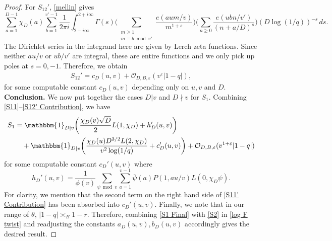 \documentclass[10pt,a4paper]{amsart}
\newcommand{\m}{\mathrm{m}}
\newcommand{\ol}{\overline}
\begin{document}
\begin{proof}
For $S_{12}'$, \eqref{mellin} gives 
\[
\sum_{a=1}^{D-1}\chi_D(a)\sum_{b=1}^{v'-1}
\frac{1}{2\pi i }\int_{2-i\infty}^{2+i\infty}
\Gamma(s)\bigg(\sum_{\substack{m\geq 1\\m\equiv b \bmod v'}}\frac{e(aum/v)}{m^{1+s}}\bigg)\bigg(\sum_{n\geq 0}\frac{e(ubn/v')}{(n+a/D)^s}\bigg)(D\log(1/q))^{-s}\, ds.
\]
The Dirichlet series in the integrand here are given by Lerch zeta functions. Since neither $au/v$ or $ub/v'$ are integral, these are entire functions and we only pick up poles at $s=0,-1$. Therefore, we obtain
\begin{align}
\label{S12' Contribution}
S_{12}' = c_D(u,v) +\mathcal{O}_{D,B, \varepsilon}(v^{\varepsilon} \lvert 1-q \rvert),
\end{align}
for some computable constant $c_D(u,v)$ depending only on $u,v$ and $D$.\\

\noindent \textbf{Conclusion.} We now put together the cases $D|v$ and $D\nmid v$ for $S_1$. Combining \eqref{S11}--\eqref{S12' Contribution}, we have
\begin{align}\label{S1 Final}
S_1
&=
  \mathbbm{1}_{D\nmid v} \bigg(\frac{ \chi_D(v)\sqrt{D}}{2}L(1,\chi_D)+h_D'(u,v)\bigg)
\notag \\
&\quad +
\mathbbm{1}_{D|v}\bigg(\frac{\chi_D(u)D^{3/2}L(2,\chi_D)}{v^2\log(1/q)}+c_D'(u,v)\bigg)+\mathcal{O}_{D,B, \varepsilon}(v^{1+\varepsilon}|1-q|)
\end{align}
for some computable constant $c_D'(u,v)$ where 
\[
h_D'(u,v)
=
\frac{1}{\phi(v)}\sum_{\psi \bmod v}\sum_{a=1}^{v-1} 
{\ol{\psi}(a)}P(1,au/v)L(0,\chi_D\psi).
\] 
For clarity, we mention that the second term on the right hand side of \eqref{S11' Contribution} has been absorbed into $c_D'(u,v)$. Finally, we note that in our range of $\theta$, $\lvert 1-q \rvert \asymp_B 1-r.$ Therefore, combining \eqref{S1 Final} with \eqref{S2} in \eqref{log F twist} and readjusting the constants $a_D(u,v),b_D(u,v)$ accordingly gives the desired result.
\end{proof}
\end{document}
